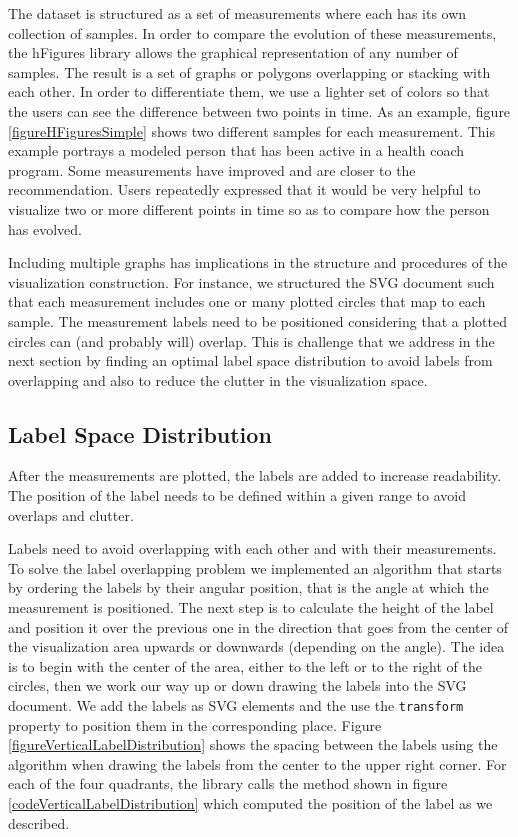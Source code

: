 \documentclass[twocolumn]{bmcart}%
\begin{document}
The dataset is structured as a set of measurements where each has its own collection of samples. In order to compare the evolution of these measurements, the hFigures library allows the graphical representation of any number of samples. The result is a set of graphs or polygons overlapping or stacking with each other. In order to differentiate them, we use a lighter set of colors so that the users can see the difference between two points in time. As an example, figure \ref{figureHFiguresSimple} shows two different samples for each measurement. This example portrays a modeled person that has been active in a health coach program. Some measurements have improved and are closer to the recommendation. Users repeatedly expressed that it would be very helpful to visualize two or more different points in time so as to compare how the person has evolved. 

Including multiple graphs has implications in the structure and procedures of the visualization construction. For instance, we structured the SVG document such that each measurement includes one or many plotted circles that map to each sample. The measurement labels need to be positioned considering that a plotted circles can (and probably will) overlap. This is challenge that we address in the next section by finding an optimal label space distribution to avoid labels from overlapping and also to reduce the clutter in the visualization space.

\subsection*{Label Space Distribution}

After the measurements are plotted, the labels are added to increase readability. The position of the label needs to be defined within a given range to avoid overlaps and clutter.


Labels need to avoid overlapping with each other and with their measurements. To solve the label overlapping problem we implemented an algorithm that starts by ordering the labels by their angular position, that is the angle at which the measurement is positioned. The next step is to calculate the height of the label and position it over the previous one in the direction that goes from the center of the visualization area upwards or downwards (depending on the angle). The idea is to begin with the center of the area, either to the left or to the right of the circles, then we work our way up or down drawing the labels into the SVG document. We add the labels as SVG elements and the use the \texttt{transform} property to position them in the corresponding place. Figure \ref{figureVerticalLabelDistribution} shows the spacing between the labels using the algorithm when drawing the labels from the center to the upper right corner. For each of the four quadrants, the library calls the method shown in figure \ref{codeVerticalLabelDistribution} which computed the position of the label as we described.
\end{document}
